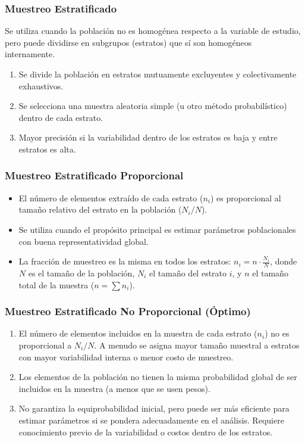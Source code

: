 \documentclass[12pt, letterpaper]{article}
\begin{document}
\subsubsection{Muestreo Estratificado}
Se utiliza cuando la población no es homogénea respecto a la variable de estudio, pero puede dividirse en subgrupos (estratos) que sí son homogéneos internamente.
\begin{enumerate}
    \item Se divide la población en estratos mutuamente excluyentes y colectivamente exhaustivos.
    \item Se selecciona una muestra aleatoria simple (u otro método probabilístico) dentro de cada estrato.
    \item Mayor precisión si la variabilidad dentro de los estratos es baja y entre estratos es alta. %
\end{enumerate}

\subsubsection*{Muestreo Estratificado Proporcional} %
\begin{itemize}
    \item El número de elementos extraído de cada estrato ($n_i$) es proporcional al tamaño relativo del estrato en la población ($N_i/N$).
    \item Se utiliza cuando el propósito principal es estimar parámetros poblacionales con buena representatividad global. %
    \item La fracción de muestreo es la misma en todos los estratos: $n_i = n \cdot \frac{N_i}{N}$, donde $N$ es el tamaño de la población, $N_i$ el tamaño del estrato $i$, y $n$ el tamaño total de la muestra ($n = \sum n_i$). %
\end{itemize}

\subsubsection*{Muestreo Estratificado No Proporcional (Óptimo)} %
\begin{enumerate}
    \item El número de elementos incluidos en la muestra de cada estrato ($n_i$) no es proporcional a $N_i/N$. A menudo se asigna mayor tamaño muestral a estratos con mayor variabilidad interna o menor costo de muestreo. %
    \item Los elementos de la población no tienen la misma probabilidad global de ser incluidos en la muestra (a menos que se usen pesos). %
    \item No garantiza la equiprobabilidad inicial, pero puede ser más eficiente para estimar parámetros si se pondera adecuadamente en el análisis. Requiere conocimiento previo de la variabilidad o costos dentro de los estratos. %
\end{enumerate}
\end{document}
